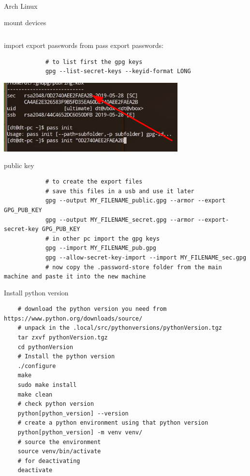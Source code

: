\begin{section}{Arch Linux}
\begin{subsection}{mount devices}
\begin{verbatim}
		\end{verbatim}
	\end{subsection}
	\newpage
	\begin{subsection}{import export passwords from pass}
		export passwords:
		\begin{verbatim}
			# to list first the gpg keys
			gpg --list-secret-keys --keyid-format LONG
		\end{verbatim}
		\includegraphics{img_ArchLinux/publicKeyImage.png}\caption{public key}
		\begin{verbatim}
			# to create the export files
			# save this files in a usb and use it later
			gpg --output MY_FILENAME_public.gpg --armor --export GPG_PUB_KEY
			gpg --output MY_FILENAME_secret.gpg --armor --export-secret-key GPG_PUB_KEY
			# in other pc import the gpg keys
			gpg --import MY_FILENAME_pub.gpg
			gpg --allow-secret-key-import --import MY_FILENAME_sec.gpg
			# now copy the .password-store folder from the main machine and paste it into the new machine
		\end{verbatim}


	\end{subsection}

	\begin{section}{Install python version}
		\begin{verbatim}
	# download the python version you need from https://www.python.org/downloads/source/
	# unpack in the .local/src/pythonversions/pythonVersion.tgz
	tar zxvf pythonVersion.tgz
	cd pythonVersion
	# Install the python version
	./configure
	make
	sudo make install
	make clean
	# check python version
	python[python_version] --version
	# create a python environment using that python version
	python[python_version] -m venv venv/
	# source the environment
	source venv/bin/activate
	# for deactivating
	deactivate
		\end{verbatim}
	\end{section}

\end{section}
